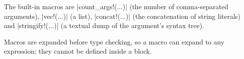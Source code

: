 The built-in macros are \fc|count_args!(...)| (the number of
comma-separated arguments), \fc|vec!(...)| (a list), \fc|concat!(...)| (the
concatenation of string literals) and \fc|stringify!(...)| (a textual dump of
the argument's syntax tree).


Macros are expanded before type checking, so a macro can expand to any
expression; they cannot be defined inside a block.
